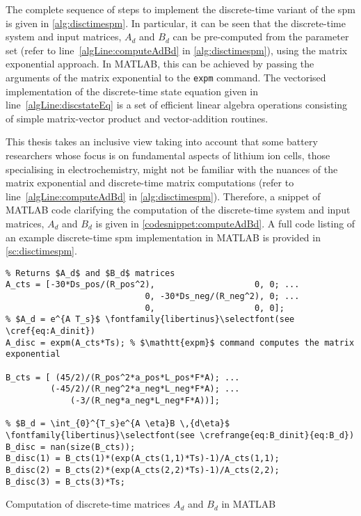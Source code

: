 The complete  sequence of steps  to implement  the discrete-time variant  of the
\gls{spm}  is given  in \cref{alg:disctimespm}. In  particular, it  can be  seen
that  the discrete-time  system  and  input matrices,  $A_d$  and  $B_d$ can  be
pre-computed  from the  parameter set  (refer to  line~\ref{algLine:computeAdBd}
in \cref{alg:disctimespm}),   using   the   matrix  exponential   approach.   In
\textsc{MATLAB}, this  can be achieved  by passing  the arguments of  the matrix
exponential to  the \verb+expm+  command. The  vectorised implementation  of the
discrete-time state equation given in line~\ref{algLine:discstateEq} is a set of
efficient linear  algebra operations consisting of  simple matrix-vector product
and vector-addition routines.



This  thesis takes  an  inclusive view  taking into  account  that some  battery
researchers whose  focus is on fundamental  aspects of lithium ion  cells, \eg{}
those specialising in  electrochemistry, might not be familiar  with the nuances
of  the  matrix exponential  and  discrete-time  matrix computations  (refer  to
line~\ref{algLine:computeAdBd} in \cref{alg:disctimespm}).  Therefore, a snippet
of \textsc{MATLAB} code  clarifying the computation of  the discrete-time system
and input matrices, $A_d$ and  $B_d$ is given in \cref{codesnippet:computeAdBd}.
A  full code  listing of  an example  discrete-time \gls{spm}  implementation in
\textsc{MATLAB} is provided in \cref{sc:disctimespm}.

\begin{listing}[!htbp]
\begin{verbatim}
% Returns $A_d$ and $B_d$ matrices
A_cts = [-30*Ds_pos/(R_pos^2),                    0, 0; ...
                            0, -30*Ds_neg/(R_neg^2), 0; ...
                            0,                    0, 0];
% $A_d = e^{A T_s}$ \fontfamily{libertinus}\selectfont(see \cref{eq:A_dinit})
A_disc = expm(A_cts*Ts); % $\mathtt{expm}$ command computes the matrix exponential

B_cts = [ (45/2)/(R_pos^2*a_pos*L_pos*F*A); ...
         (-45/2)/(R_neg^2*a_neg*L_neg*F*A); ...
             (-3/(R_neg*a_neg*L_neg*F*A))];

% $B_d = \int_{0}^{T_s}e^{A \eta}B \,{d\eta}$ \fontfamily{libertinus}\selectfont(see \crefrange{eq:B_dinit}{eq:B_d})
B_disc = nan(size(B_cts));
B_disc(1) = B_cts(1)*(exp(A_cts(1,1)*Ts)-1)/A_cts(1,1);
B_disc(2) = B_cts(2)*(exp(A_cts(2,2)*Ts)-1)/A_cts(2,2);
B_disc(3) = B_cts(3)*Ts;
\end{verbatim}
\caption{Computation of discrete-time matrices $A_d$ and $B_d$ in
\textsc{MATLAB}}
\label{codesnippet:computeAdBd}
\end{listing}

